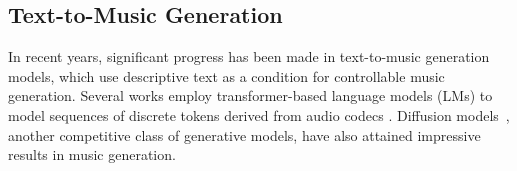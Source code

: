 \subsection{Text-to-Music Generation}
In recent years, significant progress has been made in text-to-music generation models, which use descriptive text as a condition for controllable music generation.
Several works \cite{agostinelli2023musiclm, copet2024musicgen} employ transformer-based language models (LMs) \citep{vaswani2017attention} to model sequences of discrete tokens derived from audio codecs \citep{defossez2022encodec, zeghidour2021soundstream,yang2023hifi, kumar2024DAC}.
Diffusion models~\citep{sohl2015deep, ho2020denoising, kingma2021variational}, another competitive class of generative models, have also attained impressive results in music generation\cite{forsgren2022riffusion, chen2024musicldm, evans2024stable,schneider2023mo, huang2023noise2music, liu2024audioldm}.
